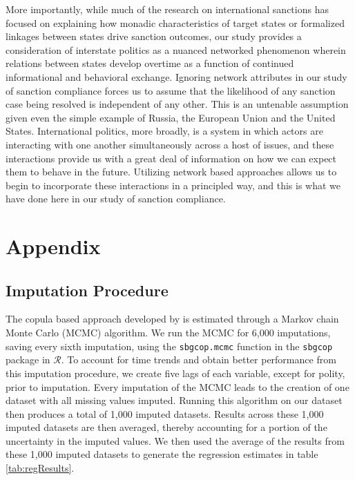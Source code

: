 More importantly, while much of the research on international sanctions has focused on explaining how monadic characteristics of target states or formalized linkages between states drive sanction outcomes, our study provides a consideration of interstate politics as a nuanced networked phenomenon wherein relations between states develop overtime as a function of continued informational and behavioral exchange. Ignoring network attributes in our study of sanction compliance forces us to assume that the likelihood of any sanction case being resolved is independent of any other. This is an untenable assumption given even the simple example of Russia, the European Union and the United States. International politics, more broadly, is a system in which actors are interacting with one another simultaneously across a host of issues, and these interactions provide us with a great deal of information on how we can expect them to behave in the future. Utilizing network based approaches allows us to begin to incorporate these interactions in a principled way, and this is what we have done here in our study of sanction compliance.

\newpage
\section*{Appendix}
\label{appendix}

\subsection*{Imputation Procedure}
\label{appImp}

The copula based approach developed by \citet{hoff:2007} is estimated through a Markov chain Monte Carlo (MCMC) algorithm. We run the MCMC for 6,000 imputations, saving every sixth imputation, using the \texttt{sbgcop.mcmc} function in the \texttt{sbgcop} package in $\mathcal{R}$. To account for time trends and obtain better performance from this imputation procedure, we create five lags of each variable, except for polity, prior to imputation. Every imputation of the MCMC leads to the creation of one dataset with all missing values imputed. Running this algorithm on our dataset then produces a total of 1,000 imputed datasets. Results across these 1,000 imputed datasets are then averaged, thereby accounting for a portion of the uncertainty in the imputed values. We then used the average of the results from these 1,000 imputed datasets to generate the regression estimates in table \ref{tab:regResults}. 

